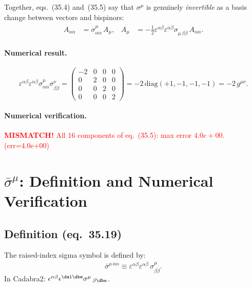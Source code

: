 \documentclass[12pt]{article}
\begin{document}
Together, eqs.~(35.4) and~(35.5) say that $\sigma^\mu$ is genuinely
\emph{invertible} as a basis change between vectors and bispinors:
\begin{align*}
  A_{\alpha\dot\alpha} &= \sigma^\mu_{\alpha\dot\alpha}\,A_\mu, &
  A_\mu &= -\tfrac{1}{2}\varepsilon^{\alpha\beta}\varepsilon^{\dot\alpha\dot\beta}
           \sigma_{\mu\,\beta\dot\beta}\,A_{\alpha\dot\alpha}.
\end{align*}

\paragraph{Numerical result.}
\[
  \varepsilon^{\alpha\beta}\varepsilon^{\dot\alpha\dot\beta}
  \sigma^\mu_{\alpha\dot\alpha}\sigma^\nu_{\beta\dot\beta} =
  \begin{pmatrix}
    -2 & 0 & 0 & 0 \\
    0 & 2 & 0 & 0 \\
    0 & 0 & 2 & 0 \\
    0 & 0 & 0 & 2
  \end{pmatrix}
  = -2\,\mathrm{diag}(+1,-1,-1,-1) = -2\,g^{\mu\nu}.
\]

\paragraph{Numerical verification.}
\textcolor{red}{\textbf{MISMATCH!} All 16 components of eq.~(35.5): max error $4.0e+00$. (err=4.0e+00)}

\section{\texorpdfstring{$\bar\sigma^\mu$}{sigmabar\^{}mu}:
         Definition and Numerical Verification \quad [eq.~35.19--35.20]}

\subsection{Definition (eq.~35.19)}

The raised-index sigma symbol is defined by:
\begin{equation}
  \bar\sigma^{\mu\,\dot\alpha\alpha}
  \equiv \varepsilon^{\alpha\beta}\varepsilon^{\dot\alpha\dot\beta}\,
         \sigma^\mu_{\beta\dot\beta}.
  \tag{35.19}
\end{equation}
In Cadabra2: $\epsilon^{\alpha \beta} \epsilon^{\dal \dbe} \sigma^{\mu}\,_{\beta \dbe}$.
\end{document}
